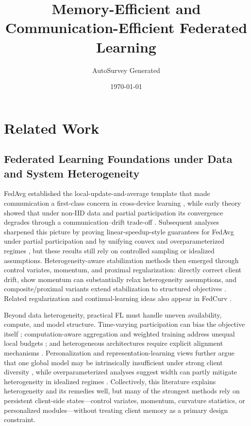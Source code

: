 \documentclass[11pt]{article}
\title{Memory-Efficient and Communication-Efficient Federated Learning}
\author{AutoSurvey Generated}
\date{\today}
\begin{document}
\maketitle

\section{Related Work}

\subsection{Federated Learning Foundations under Data and System Heterogeneity}

FedAvg established the local-update-and-average template that made communication a first-class concern in cross-device learning \citep{mcmahan2017communication}, while early theory showed that under non-IID data and partial participation its convergence degrades through a communication--drift trade-off \citep{li2019convergence}. Subsequent analyses sharpened this picture by proving linear-speedup-style guarantees for FedAvg under partial participation and by unifying convex and overparameterized regimes \citep{Yang2021AchievingLS, qu2023unified}, but these results still rely on controlled sampling or idealized assumptions. Heterogeneity-aware stabilization methods then emerged through control variates, momentum, and proximal regularization: \citet{karimireddy2020scaffold} directly correct client drift, \citet{Cheng2023MomentumBN} show momentum can substantially relax heterogeneity assumptions, and composite/proximal variants extend stabilization to structured objectives \citep{Zhou2025FedCanonNC, zhang2025convex}. Related regularization and continual-learning ideas also appear in FedCurv \citep{shoham2019overcoming}. 

Beyond data heterogeneity, practical FL must handle uneven availability, compute, and model structure. Time-varying participation can bias the objective itself \citep{xiang2023towards}; computation-aware aggregation and weighted training address unequal local budgets \citep{Zhang2022CCFedAvgCC, daning2017weighted}; and heterogeneous architectures require explicit alignment mechanisms \citep{Yu2020HeterogeneousFL}. Personalization and representation-learning views further argue that one global model may be intrinsically insufficient under strong client diversity \citep{reguieg2023comparative, collins2022fedavg, su2023non, wang2024federated}, while overparameterized analyses suggest width can partly mitigate heterogeneity in idealized regimes \citep{jian2025widening}. Collectively, this literature explains heterogeneity and its remedies well, but many of the strongest methods rely on persistent client-side states---control variates, momentum, curvature statistics, or personalized modules---without treating client memory as a primary design constraint.
\end{document}
